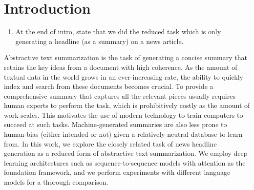 \section{Introduction}

\begin{enumerate}
\item At the end of intro, state that we did the reduced task which is only generating a headline (as a summary) on a news article.
\end{enumerate}


Abstractive text summarization is the task of generating a concise summary that retains the key ideas from a document with high coherence. As the amount of textual data in the world grows in an ever-increasing rate, the ability to quickly index and search from these documents becomes crucial. To provide a comprehensive summary that captures all the relevant pieces usually requires human experts to perform the task, which is prohibitively costly as the amount of work scales. This motivates the use of modern technology to train computers to succeed at such tasks. Machine-generated summaries are also less prone to human-bias (either intended or not) given a relatively neutral database to learn from. In this work, we explore the closely related task of news headline generation as a reduced form of abstractive text summarization. We employ deep learning architectures such as sequence-to-sequence models with attention as the foundation framework, and we perform experiments with different language models for a thorough comparison.